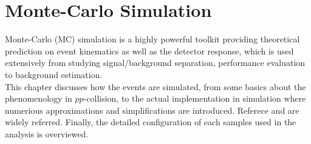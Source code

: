 \chapter{Monte-Carlo Simulation} \label{sec::Samples}
Monte-Carlo (MC) simulation is a highly powerful toolkit providing theoretical prediction on event kinematics as well as the detector response, 
which is used extensively from studying signal/background separation, performance evaluation to background estimation. \\

This chapter discusses how the events are simulated, from some basics about the phenomenology in $pp$-collision, 
to the actual implementation in simulation where numerious approximations and simplifications are introduced. 
Referece \cite{ATLAS_generator} and \cite{SkandsQCD} are widely referred. 
Finally, the detailed configuration of each samples used in the analysis is overviewed.  \\


